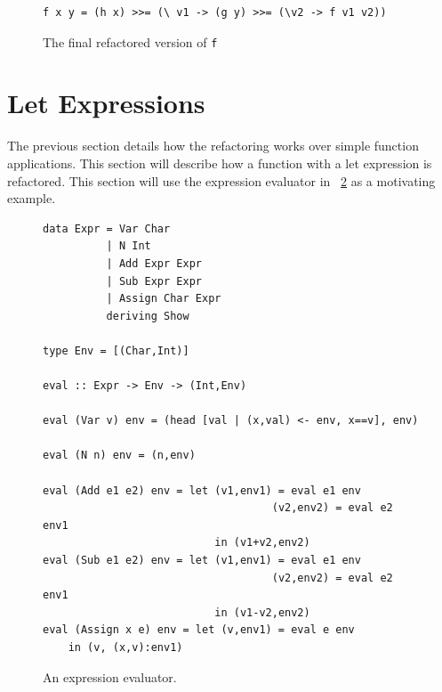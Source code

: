 \begin{figure}[t]
\DIFdelbeginFL %
\DIFdelendFL \DIFaddbeginFL \begin{lstlisting}
f x y = (h x) >>= (\ v1 -> (g y) >>= (\v2 -> f v1 v2))
\end{lstlisting}
\DIFaddendFL \caption{The final refactored version of \texttt{f}}
\label{simpF_ref}
\end{figure}

\DIFaddbegin {}

\DIFaddend \section{Let Expressions}

The previous section details how the refactoring works over simple function applications. This section will describe how a function with a let expression is refactored. This section will use the expression evaluator in \DIFdelbegin {}\DIFdelend \DIFaddbegin {}\DIFaddend ~\ref{evalExpr} as a motivating example.

\begin{figure}[t]
\begin{lstlisting}
data Expr = Var Char
          | N Int
          | Add Expr Expr
          | Sub Expr Expr
          | Assign Char Expr
          deriving Show

type Env = [(Char,Int)]

eval :: Expr -> Env -> (Int,Env)

eval (Var v) env = (head [val | (x,val) <- env, x==v], env)

eval (N n) env = (n,env)

eval (Add e1 e2) env = let (v1,env1) = eval e1 env
                                    (v2,env2) = eval e2 env1 
                           in (v1+v2,env2)
eval (Sub e1 e2) env = let (v1,env1) = eval e1 env
                                    (v2,env2) = eval e2 env1 
                           in (v1-v2,env2)
eval (Assign x e) env = let (v,env1) = eval e env 
	in (v, (x,v):env1)
\end{lstlisting}
\caption{An expression evaluator.}
\label{evalExpr}
\end{figure}

